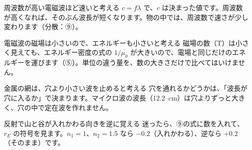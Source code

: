 \begin{tsumazuki}{周波数が高い電磁波ほど速いと考える}
$c=f\lambda$ で、$c$ は決まった値です。周波数が高くなれば、そのぶん波長が短くなります。物の中では、周波数で速さが少し変わります（分散：⑨）。
\end{tsumazuki}
\begin{tsumazuki}{電磁波の磁場は小さいので、エネルギーも小さいと考える}
磁場の数（T）は小さく見えても、エネルギー密度の式の $1/\mu_0$ が大きいので、電場と同じだけのエネルギーを運びます（⑤）。単位の違う量を、数の大きさだけで比べてはいけません。
\end{tsumazuki}
\begin{tsumazuki}{金属の網は、穴より小さい波を止めると考える}
穴を通れるかどうかは、「波長が穴に入るか」で決まります。マイクロ波の波長（\qty{12.2}{cm}）は穴よりずっと大きく、穴の中で定在波を作れません。
\end{tsumazuki}
\begin{tsumazuki}{反射で山と谷が入れかわる向きを逆に覚える}
迷ったら、⑨の式に数を入れて、$r_E$ の符号を見ます。$n_1=1$、$n_2=1.5$ なら $-0.2$（入れかわる）、逆なら $+0.2$（そのまま）です。
\end{tsumazuki}

